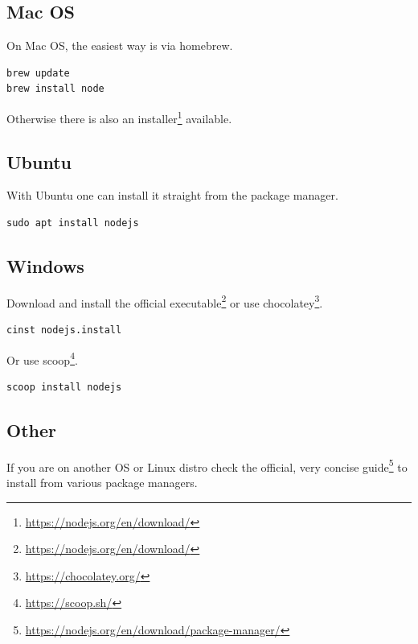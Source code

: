 \documentclass[10pt,]{krantz}
\renewcommand{\href}[2]{#2\footnote{\url{#1}}}
\begin{document}
\hypertarget{webpack-intro-install-mac}{%
\subsection{Mac OS}\label{webpack-intro-install-mac}}

On Mac OS, the easiest way is via homebrew.

\begin{verbatim}
brew update
brew install node
\end{verbatim}

Otherwise there is also an \href{https://nodejs.org/en/download/}{installer} available.

\hypertarget{webpack-intro-install-ubuntu}{%
\subsection{Ubuntu}\label{webpack-intro-install-ubuntu}}

With Ubuntu one can install it straight from the package manager.

\begin{verbatim}
sudo apt install nodejs
\end{verbatim}

\hypertarget{webpack-intro-install-windows}{%
\subsection{Windows}\label{webpack-intro-install-windows}}

Download and install the official \href{https://nodejs.org/en/download/}{executable} or use \href{https://chocolatey.org/}{chocolatey}.

\begin{verbatim}
cinst nodejs.install
\end{verbatim}

Or use \href{https://scoop.sh/}{scoop}.

\begin{verbatim}
scoop install nodejs
\end{verbatim}

\hypertarget{webpack-intro-install-other}{%
\subsection{Other}\label{webpack-intro-install-other}}

If you are on another OS or Linux distro check the official, very concise \href{https://nodejs.org/en/download/package-manager/}{guide} to install from various package managers.
\end{document}
